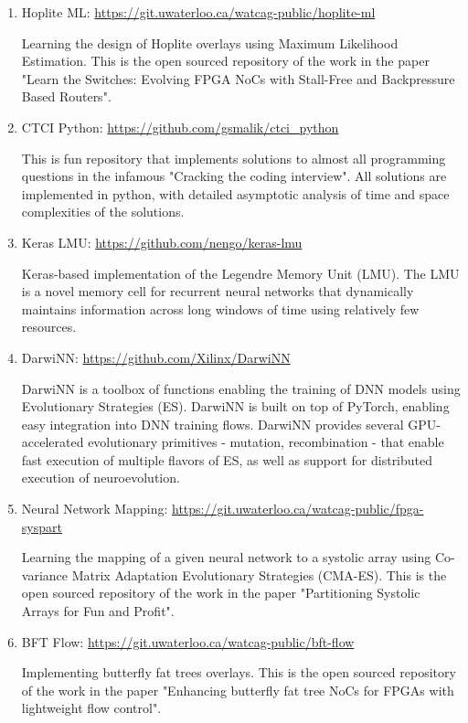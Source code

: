 \justify
\begin{enumerate}
    \item Hoplite ML: \href{https://git.uwaterloo.ca/watcag-public/hoplite-ml}{https://git.uwaterloo.ca/watcag-public/hoplite-ml}
    
    Learning the design of Hoplite overlays using Maximum Likelihood Estimation. This is the open sourced repository of the work in the paper "Learn the Switches: Evolving FPGA NoCs with Stall-Free and Backpressure Based Routers".
    
    \item CTCI Python: \href{https://github.com/gsmalik/ctci_python}{https://github.com/gsmalik/ctci\_python}
    
    This is fun repository that implements solutions to almost all programming questions in the infamous "Cracking the coding interview". All solutions are implemented in python, with detailed asymptotic analysis of time and space complexities of the solutions.
    
    \item Keras LMU: \href{https://github.com/nengo/keras-lmu}{https://github.com/nengo/keras-lmu}
    
    Keras-based implementation of the Legendre Memory Unit (LMU). The LMU is a novel memory cell for recurrent neural networks that dynamically maintains information across long windows of time using relatively few resources.
    
    \item DarwiNN: \href{https://github.com/Xilinx/DarwiNN}{https://github.com/Xilinx/DarwiNN}
    
    DarwiNN is a toolbox of functions enabling the training of DNN models using Evolutionary Strategies (ES). DarwiNN is built on top of PyTorch, enabling easy integration into DNN training flows. DarwiNN provides several GPU-accelerated evolutionary primitives - mutation, recombination - that enable fast execution of multiple flavors of ES, as well as support for distributed execution of neuroevolution.
    
    \item Neural Network Mapping: \href{https://git.uwaterloo.ca/watcag-public/fpga-syspart}{https://git.uwaterloo.ca/watcag-public/fpga-syspart}
    
    Learning the mapping of a given neural network to a systolic array using Co-variance Matrix Adaptation Evolutionary Strategies (CMA-ES). This is the open sourced repository of the work in the paper "Partitioning Systolic Arrays for Fun and Profit".
    
    \item BFT Flow: \href{https://git.uwaterloo.ca/watcag-public/bft-flow}{https://git.uwaterloo.ca/watcag-public/bft-flow}
    
    Implementing butterfly fat trees overlays. This is the open sourced repository of the work in the paper "Enhancing butterfly fat tree NoCs for FPGAs with lightweight flow control".
\end{enumerate}

